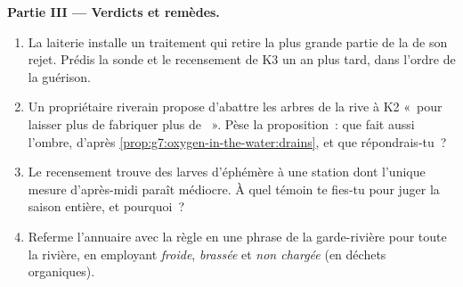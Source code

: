 \begin{problem}
\medskip\noindent\textbf{Partie III --- Verdicts et
remèdes.}
\begin{enumerate}[resume]
  \item La laiterie installe un traitement qui retire la plus
        grande partie de la  de son rejet. Prédis
        la sonde et le recensement de K3 un an plus tard, dans
        l'ordre de la guérison.
  \item Un propriétaire riverain propose d'abattre les arbres de
        la rive à K2 «~pour laisser plus de  fabriquer plus
        de ~». Pèse la proposition~: que fait aussi
        l'ombre, d'après
        \cref{prop:g7:oxygen-in-the-water:drains}, et que
        répondrais-tu~?
  \item Le recensement trouve des larves d'éphémère à une station
        dont l'unique mesure d'après-midi paraît médiocre. À quel
        témoin te fies-tu pour juger la saison entière, et
        pourquoi~?
  \item Referme l'annuaire avec la règle en une phrase de la
        garde-rivière pour toute la rivière, en employant
        \emph{froide}, \emph{brassée} et \emph{non chargée} (en
        déchets organiques).
\end{enumerate}
\end{problem}
